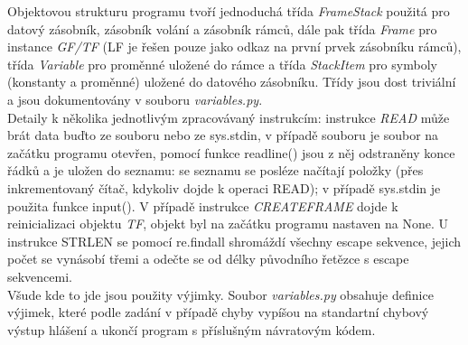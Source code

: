 \documentclass[10pt]{article}
\begin{document}
Objektovou strukturu programu tvoří jednoduchá třída \textit{FrameStack} použitá pro datový zásobník, zásobník volání a zásobník rámců, dále pak třída \textit{Frame} pro instance \textit{GF/TF} (LF je řešen pouze jako odkaz na první prvek zásobníku rámců), třída \textit{Variable} pro proměnné uložené do rámce a třída \textit{StackItem} pro symboly (konstanty a proměnné) uložené do datového zásobníku. Třídy jsou dost triviální a jsou dokumentovány v souboru \textit{variables.py}.\\
Detaily k několika jednotlivým zpracovávaný instrukcím: instrukce \textit{READ} může brát data buďto ze souboru nebo ze sys.stdin, v případě souboru je soubor na začátku programu otevřen, pomocí funkce readline() jsou z něj odstraněny konce řádků a je uložen do seznamu: se seznamu se posléze načítají položky (přes inkrementovaný čítač, kdykoliv dojde k operaci READ); v případě sys.stdin je použita funkce input(). V případě instrukce \textit{CREATEFRAME} dojde k reinicializaci objektu \textit{TF}, objekt byl na začátku programu nastaven na None. U instrukce STRLEN se pomocí re.findall shromáždí všechny escape sekvence, jejich počet se vynásobí třemi a odečte se od délky původního řetězce s escape sekvencemi.\\
Všude kde to jde jsou použity výjimky. Soubor \textit{variables.py} obsahuje definice výjimek, které podle zadání v případě chyby vypíšou na standartní chybový výstup hlášení a ukončí program s příslušným návratovým kódem. 
\end{document}
